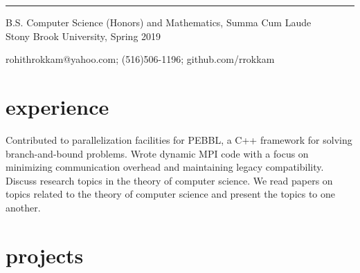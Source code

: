 \documentclass{cv}
\begin{document}
\rule{\textwidth}{0.4pt}
\begin{center}
B.S. Computer Science (Honors) and Mathematics, Summa Cum Laude \\
Stony Brook University, Spring 2019

rohithrokkam@yahoo.com; (516)506-1196; github.com/rrokkam 

\end{center}


\section{experience}

\begin{entrylist}
    {Contributed to parallelization facilities for PEBBL, a C++ framework for solving branch-and-bound problems. Wrote dynamic MPI code with a focus on minimizing communication overhead and maintaining legacy compatibility.}
    {Discuss research topics in the theory of computer science. We read papers on topics related to the theory of computer science and present the topics to one another.}
\end{entrylist}

\section{projects}
\end{document}
